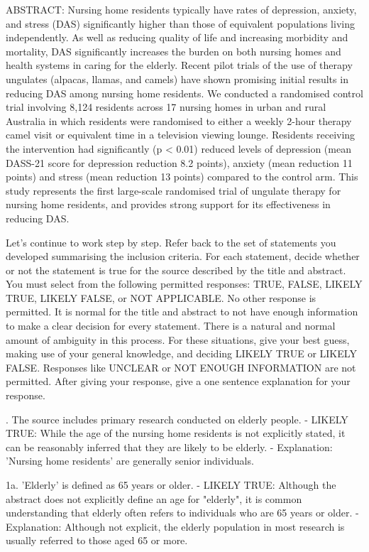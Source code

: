 \documentclass{article}
\begin{document}
\begin{description}
  ABSTRACT: Nursing home residents typically have rates of depression, anxiety,
  and stress (DAS) significantly higher than those of equivalent populations
  living independently. As well as reducing quality of life and increasing
  morbidity and mortality, DAS significantly increases the burden on both
  nursing homes and health systems in caring for the elderly. Recent pilot
  trials of the use of therapy ungulates (alpacas, llamas, and camels) have
  shown promising initial results in reducing DAS among nursing home residents.
  We conducted a randomised control trial involving 8,124 residents across 17
  nursing homes in urban and rural Australia in which residents were randomised
  to either a weekly 2-hour therapy camel visit or equivalent time in a
  television viewing lounge. Residents receiving the intervention had
  significantly (p < 0.01) reduced levels of depression (mean DASS-21 score for
  depression reduction 8.2 points), anxiety (mean reduction 11 points) and
  stress (mean reduction 13 points) compared to the control arm. This study
  represents the first large-scale randomised trial of ungulate therapy for
  nursing home residents, and provides strong support for its effectiveness in
  reducing DAS.

  \System Let's continue to work step by step. Refer back to the set of
  statements you developed summarising the inclusion criteria. For each
  statement, decide whether or not the statement is true for the source
  described by the title and abstract. You must select from the following
  permitted responses: TRUE, FALSE, LIKELY TRUE, LIKELY FALSE, or NOT
  APPLICABLE. No other response is permitted. It is normal for the title and
  abstract to not have enough information to make a clear decision for every
  statement. There is a natural and normal amount of ambiguity in this process.
  For these situations, give your best guess, making use of your general
  knowledge, and deciding LIKELY TRUE or LIKELY FALSE. Responses like UNCLEAR
  or NOT ENOUGH INFORMATION are not permitted. After giving your response, give
  a one sentence explanation for your response.

  . The source includes primary research conducted on elderly people. -
  LIKELY TRUE: While the age of the nursing home residents is not explicitly
  stated, it can be reasonably inferred that they are likely to be elderly. -
  Explanation: 'Nursing home residents' are generally senior individuals.

  1a. 'Elderly' is defined as 65 years or older. - LIKELY TRUE: Although the
  abstract does not explicitly define an age for "elderly", it is common
  understanding that elderly often refers to individuals who are 65 years or
  older. - Explanation: Although not explicit, the elderly population in most
  research is usually referred to those aged 65 or more.


\end{description}
\end{document}
